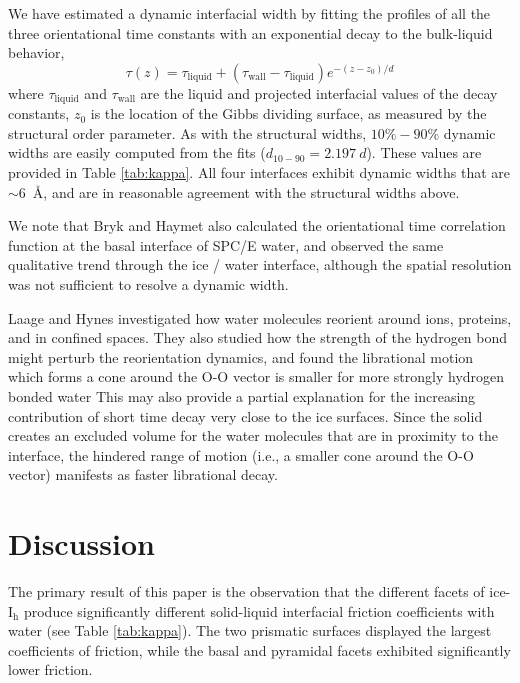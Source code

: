 We have estimated a dynamic interfacial width by fitting the profiles
of all the three orientational time constants with an exponential
decay to the bulk-liquid behavior,
\begin{equation}\label{tauFit}
  \tau(z) = \tau_\mathrm{liquid}+(\tau_\mathrm{wall}-\tau_\mathrm{liquid})e^{-(z-z_{0})/d}
\end{equation}
where $\tau_\mathrm{liquid}$ and $\tau_\mathrm{wall}$ are the liquid
and projected interfacial values of the decay constants, $z_{0}$ is
the location of the Gibbs dividing surface, as measured by the
structural order parameter.  As with the structural widths,
$10\%-90\%$ dynamic widths are easily computed from the fits
($d_\mathrm{10-90} = 2.197~d$).  These values are provided in Table
\ref{tab:kappa}. All four interfaces exhibit dynamic widths that are
$\sim 6$~\AA, and are in reasonable agreement with the structural
widths above.

We note that Bryk and Haymet also calculated the orientational time
correlation function at the basal interface of SPC/E
water,\cite{Bryk2002} and observed the same qualitative trend through
the ice / water interface, although the spatial resolution was not
sufficient to resolve a dynamic width.
 
Laage and Hynes investigated how water molecules reorient around
ions\cite{Laage2007,Laage2008a,Stirnemann2011a,Laage2011},
proteins\cite{Duboue-Dijon2014}, and in confined
spaces\cite{Laage2012b,Fogarty2014}.  They also studied how the
strength of the hydrogen bond might perturb the reorientation
dynamics,\cite{Laage2006a} and found the librational motion which
forms a cone around the O-O vector is smaller for more strongly
hydrogen bonded water This may also provide a partial explanation for
the increasing contribution of short time decay very close to the ice
surfaces.  Since the solid creates an excluded volume for the water
molecules that are in proximity to the interface, the hindered range
of motion (i.e., a smaller cone around the O-O vector) manifests as
faster librational decay.

\section{Discussion}
The primary result of this paper is the observation that the different
facets of ice-I$_\mathrm{h}$ produce significantly different
solid-liquid interfacial friction coefficients with water (see Table
\ref{tab:kappa}).  The two prismatic surfaces displayed the largest
coefficients of friction, while the basal and pyramidal facets
exhibited significantly lower friction.

